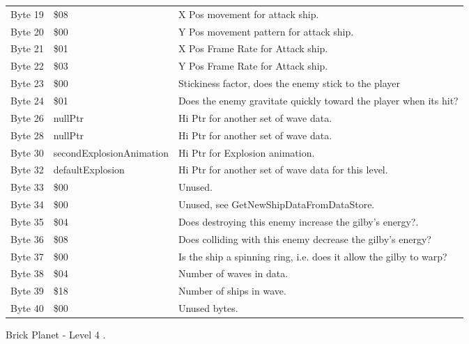 \begin{figure}[H]
{\begin{adjustbox}{width=12cm}
\begin{tabular}{lll}
 Byte 19 & \$08                      & X Pos movement for attack ship.                                    \\
 Byte 20 & \$00                      & Y Pos movement pattern for attack ship.                            \\
 Byte 21 & \$01                      & X Pos Frame Rate for Attack ship.                                  \\
 Byte 22 & \$03                      & Y Pos Frame Rate for Attack ship.                                  \\
 Byte 23 & \$00                      & Stickiness factor, does the enemy stick to the player              \\
 Byte 24 & \$01                      & Does the enemy gravitate quickly toward the player when its hit?   \\
 Byte 26 & nullPtr                  & Hi Ptr for another set of wave data.                               \\
 Byte 28 & nullPtr                  & Hi Ptr for another set of wave data.                               \\
 Byte 30 & secondExplosionAnimation & Hi Ptr for Explosion animation.                                    \\
 Byte 32 & defaultExplosion         & Hi Ptr for another set of wave data for this level.                \\
 Byte 33 & \$00                      & Unused.                                                            \\
 Byte 34 & \$00                      & Unused, see GetNewShipDataFromDataStore.                           \\
 Byte 35 & \$04                      & Does destroying this enemy increase the gilby's energy?.           \\
 Byte 36 & \$08                      & Does colliding with this enemy decrease the gilby's energy?        \\
 Byte 37 & \$00                      & Is the ship a spinning ring, i.e. does it allow the gilby to warp? \\
 Byte 38 & \$04                      & Number of waves in data.                                           \\
 Byte 39 & \$18                      & Number of ships in wave.                                           \\
 Byte 40 & \$00                      & Unused bytes.                                                      \\
\bottomrule
\end{tabular}

  \end{adjustbox}

  }\caption*{Brick Planet - Level 4
.}
\end{figure}

